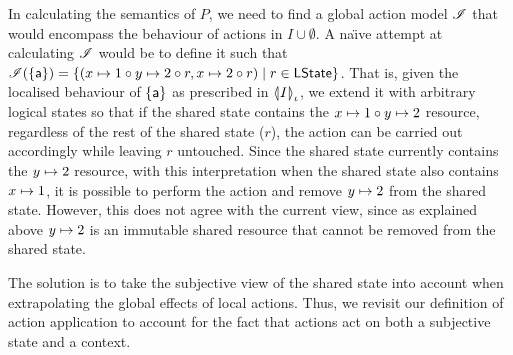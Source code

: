 \begin{example}[]
  In calculating the semantics of $P$, we need to find a global action
  model $\lmod$ that would encompass the behaviour of actions in $I
  \cup \emptyset$. A na\"\i ve attempt at calculating $\lmod$ would
  be to define it such that $\lmod(\{\token a\}) =
  \left\{(\cell{x}{1} \composeL \cell{y}{2} \composeL r, \cell{x}{2}
  \composeL r ) \mid r \in \LStates \right\}$. That is, given the
  localised behaviour of $\{\token a\}$ as prescribed in
  $\semI[\lenv]{I}$, we extend it with arbitrary logical states so
  that if the shared state contains the $\cell{x}{1} \composeL
  \cell{y}{2}$ resource, regardless of the rest of the shared state
  ($r$), the action can be carried out accordingly while leaving $r$
  untouched. Since the shared state currently contains the
  $\cell{y}{2}$ resource, with this interpretation when the shared
  state also contains $\cell{x}{1}$, it is possible to perform the
  action  and remove $\cell{y}{2}$ from the shared
  state. However, this does not agree with the current view, since as
  explained above $\cell{y}{2}$ is an immutable shared resource that
  cannot be removed from the shared state.
\end{example}

The solution is to take the subjective view of the shared state into
account when extrapolating the global effects of local actions. Thus,
we revisit our definition of action application to account for the
fact that actions act on both a subjective state and a context.


